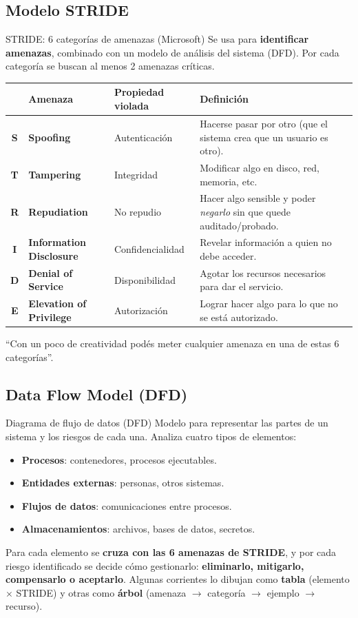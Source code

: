 \documentclass[11pt,a4paper]{article}
\begin{document}
\subsection{Modelo STRIDE}

\begin{defbox}{STRIDE: 6 categorías de amenazas (Microsoft)}
Se usa para \textbf{identificar amenazas}, combinado con un modelo de análisis del sistema
(DFD). Por cada categoría se buscan al menos 2 amenazas críticas.
\begin{center}
\renewcommand{\arraystretch}{1.25}
\begin{tabular}{c >{\bfseries}l l p{6.2cm}}
\toprule
 & Amenaza & Propiedad violada & Definición \\
\midrule
\textbf{S} & Spoofing & Autenticación & Hacerse pasar por otro (que el sistema crea que un usuario es otro).\\
\textbf{T} & Tampering & Integridad & Modificar algo en disco, red, memoria, etc.\\
\textbf{R} & Repudiation & No repudio & Hacer algo sensible y poder \emph{negarlo} sin que quede auditado/probado.\\
\textbf{I} & Information Disclosure & Confidencialidad & Revelar información a quien no debe acceder.\\
\textbf{D} & Denial of Service & Disponibilidad & Agotar los recursos necesarios para dar el servicio.\\
\textbf{E} & Elevation of Privilege & Autorización & Lograr hacer algo para lo que no se está autorizado.\\
\bottomrule
\end{tabular}
\end{center}
``Con un poco de creatividad podés meter cualquier amenaza en una de estas 6 categorías''.
\end{defbox}

\subsection{Data Flow Model (DFD)}

\begin{defbox}{Diagrama de flujo de datos (DFD)}
Modelo para representar las partes de un sistema y los riesgos de cada una. Analiza cuatro tipos
de elementos:
\begin{itemize}[leftmargin=1.4em,itemsep=1pt]
  \item \textbf{Procesos}: contenedores, procesos ejecutables.
  \item \textbf{Entidades externas}: personas, otros sistemas.
  \item \textbf{Flujos de datos}: comunicaciones entre procesos.
  \item \textbf{Almacenamientos}: archivos, bases de datos, secretos.
\end{itemize}
Para cada elemento se \textbf{cruza con las 6 amenazas de STRIDE}, y por cada riesgo
identificado se decide cómo gestionarlo: \textbf{eliminarlo, mitigarlo, compensarlo o
aceptarlo}. Algunas corrientes lo dibujan como \textbf{tabla} (elemento $\times$ STRIDE) y otras
como \textbf{árbol} (amenaza $\to$ categoría $\to$ ejemplo $\to$ recurso).
\end{defbox}
\end{document}
